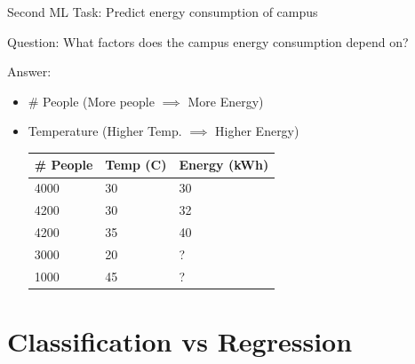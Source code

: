 \documentclass[usenames,dvipsnames]{beamer}
\begin{document}
\begin{frame}{Second ML Task: Predict energy consumption of campus}

Question: What factors does the campus energy consumption depend on?

Answer:\begin{itemize}
	\item \pause \# People (More people $\implies$ More Energy)
	\item \pause Temperature (Higher Temp. $\implies$ Higher Energy)

\pause \begin{table}[]
	\begin{tabular}{|l|l||l|}
		\hline 
		
		\textbf{\# People} & \textbf{Temp (C)} &  \textbf{Energy (kWh)} \\ \hline 
		
		4000 & 30 & 30 \\
		4200 & 30 & 32 \\
		4200 & 35 & 40 \\ \hline
		3000 & 20& ? \\
		1000 & 45 & ? \\ \hline          
	\end{tabular}
\end{table}	
\end{itemize}

\end{frame}





\section{Classification vs Regression}
\end{document}
